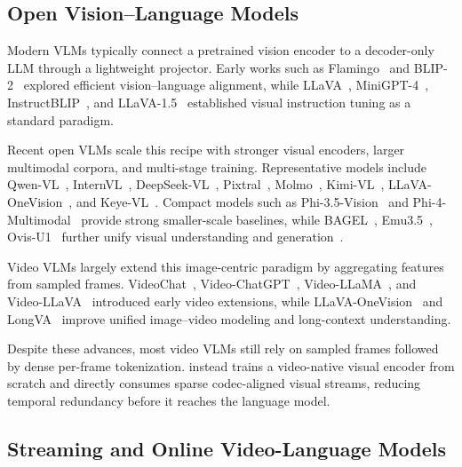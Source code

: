 \subsection{Open Vision--Language Models}
\label{sec:related_vlm}

Modern VLMs typically connect a pretrained vision encoder to a decoder-only LLM through a lightweight projector. Early works such as Flamingo~\citep{alayrac2022flamingo} and BLIP-2~\citep{li2023blip2} explored efficient vision--language alignment, while LLaVA~\citep{liu2023llava}, MiniGPT-4~\citep{zhu2023minigpt4}, InstructBLIP~\citep{dai2023instructblip}, and LLaVA-1.5~\citep{liu2024llava15} established visual instruction tuning as a standard paradigm.

Recent open VLMs scale this recipe with stronger visual encoders, larger multimodal corpora, and multi-stage training. Representative models include Qwen-VL~\citep{bai2023qwenvl,bai2025qwen25vl,qwen3vl}, InternVL~\citep{internvl3,chen2024nnvl}, DeepSeek-VL~\citep{lu2024deepseekvl}, Pixtral~\citep{agrawal2024pixtral}, Molmo~\citep{deitke2024molmo}, Kimi-VL~\citep{team2026kimi}, LLaVA-OneVision~\citep{li2024llavaonevision15,llavaonevision2}, and Keye-VL~\citep{Keye-VL-1.5}. Compact models such as Phi-3.5-Vision~\citep{abdin2024phi3} and Phi-4-Multimodal~\citep{abdin2024phi4} provide strong smaller-scale baselines, while BAGEL~\citep{deng2025bagel}, Emu3.5~\citep{cui2025emu35nativemultimodalmodels}, Ovis-U1~\cite{wang2025ovis} further unify visual understanding and generation~\cite{zhang2025unified}.

Video VLMs largely extend this image-centric paradigm by aggregating features from sampled frames. VideoChat~\citep{li2023videochat}, Video-ChatGPT~\citep{maaz2023videochatgpt}, Video-LLaMA~\citep{zhang2023videollama}, and Video-LLaVA~\citep{lin2023videollava} introduced early video extensions, while LLaVA-OneVision~\citep{li2024llavaonevision} and LongVA~\citep{zhang2024longva} improve unified image--video modeling and long-context understanding.

Despite these advances, most video VLMs still rely on sampled frames followed by dense per-frame tokenization. \magevl instead trains a video-native visual encoder from scratch and directly consumes sparse codec-aligned visual streams, reducing temporal redundancy before it reaches the language model.



\subsection{Streaming and Online Video-Language Models}
\label{sec:related_streaming}

